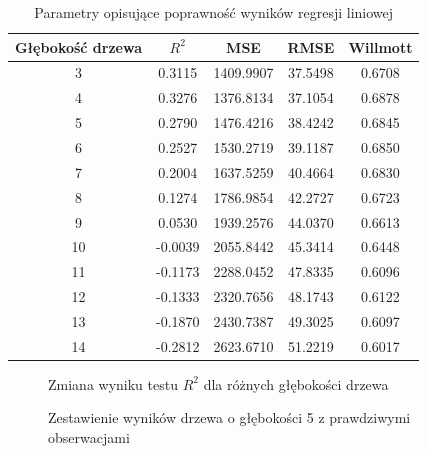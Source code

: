 \documentclass[10pt,a4paper]{article}
\begin{document}
\begin{table}[h!]
	\centering
	\begin{tabular}{|c|c|c|c|c|}
		\hline
		Głębokość drzewa & $R^2$ & MSE & RMSE & Willmott \\
		\hline
		3  & 0.3115 & 1409.9907 & 37.5498 & 0.6708 \\
		4  & 0.3276 & 1376.8134 & 37.1054 & 0.6878 \\
		5  & 0.2790 & 1476.4216 & 38.4242 & 0.6845 \\
		6  & 0.2527 & 1530.2719 & 39.1187 & 0.6850 \\
		7  & 0.2004 & 1637.5259 & 40.4664 & 0.6830 \\
		8  & 0.1274 & 1786.9854 & 42.2727 & 0.6723 \\
		9  & 0.0530 & 1939.2576 & 44.0370 & 0.6613 \\
		10 & -0.0039 & 2055.8442 & 45.3414 & 0.6448 \\
		11 & -0.1173 & 2288.0452 & 47.8335 & 0.6096 \\
		12 & -0.1333 & 2320.7656 & 48.1743 & 0.6122 \\
		13 & -0.1870 & 2430.7387 & 49.3025 & 0.6097 \\
		14 & -0.2812 & 2623.6710 & 51.2219 & 0.6017 \\
		\hline
	\end{tabular}
	\caption{Parametry opisujące poprawność wyników regresji liniowej}
	\label{table:2}
\end{table}
\begin{figure}[!ht]
	\centering
	\caption{Zmiana wyniku testu $R^2$ dla różnych głębokości drzewa}
	\label{figure:treer2}
\end{figure}
\begin{figure}[!ht]
	\centering
	\caption{Zestawienie wyników drzewa o głębokości 5 z prawdziwymi obserwacjami}
	\label{figure:tree5}
\end{figure}
\end{document}
